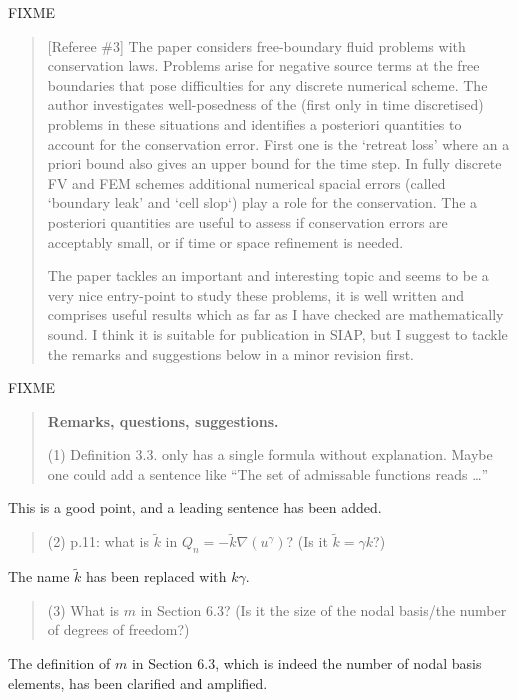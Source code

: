 \documentclass[12pt]{amsart}
\newcommand{\mm}{\medskip \noindent}
\begin{document}
FIXME

\begin{quote}
[Referee \#3] The paper considers free-boundary fluid problems with conservation laws. Problems arise for negative source terms at the free boundaries that pose difficulties for any discrete numerical scheme.  The author investigates well-posedness of the (first only in time discretised) problems in these situations and identifies a posteriori quantities to account for the conservation error.  First one is the `retreat loss' where an a priori bound also gives an upper bound for the time step.  In fully discrete FV and FEM schemes additional numerical spacial errors (called `boundary leak' and
`cell slop`) play a role for the conservation.  The a posteriori quantities are useful to assess if conservation errors are acceptably small, or if time or space refinement is needed.

\mm The paper tackles an important and interesting topic and seems to be a very nice entry-point to study these problems, it is well written and comprises useful results which as far as I have checked are mathematically sound.  I think it is suitable for publication in SIAP, but I suggest to tackle the remarks and suggestions below in a minor revision first.
\end{quote}

FIXME

\begin{quote}
\textbf{Remarks, questions, suggestions.}

\mm (1) Definition 3.3. only has a single formula without explanation. Maybe one could add a sentence like ``The set of admissable functions reads \dots''
\end{quote}

This is a good point, and a leading sentence has been added.

\begin{quote}
\mm (2) p.11: what is $\tilde k$ in $Q_n = - \tilde k\nabla(u^\gamma)$?  (Is it $\tilde k = \gamma k$?)
\end{quote}

The name $\tilde k$ has been replaced with $k \gamma$.

\begin{quote}
\mm (3) What is $m$ in Section 6.3? (Is it the size of the nodal basis/the number of degrees of freedom?)
\end{quote}

The definition of $m$ in Section 6.3, which is indeed the number of nodal basis elements, has been clarified and amplified.
\end{document}
